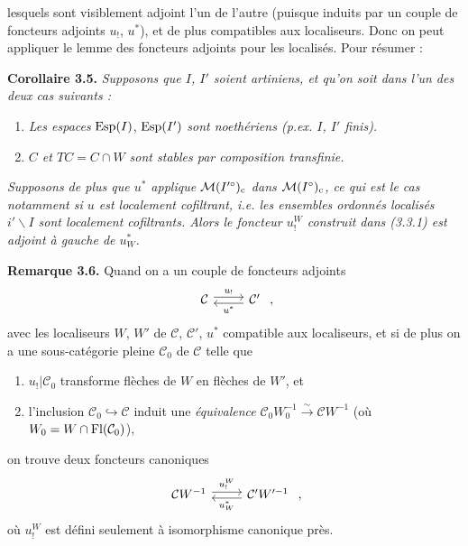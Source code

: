 lesquels sont visiblement adjoint l'un de l'autre (puisque induits par un couple de foncteurs %
adjoints $u_!$, $u^*$), et de plus compatibles aux localiseurs. Donc on peut appliquer le lemme des foncteurs adjoints pour les localisés. Pour résumer :

\textbf{Corollaire 3.5.} \textit{Supposons que $I$, $I'$ soient artiniens, et qu'on soit dans l'un des deux cas suivants :}
\begin{enumerate}
\item[a)] \textit{Les espaces} $\operatorname{Esp}(I)$, $\operatorname{Esp}(I')$ \textit{sont noethériens (p.ex. $I$, $I'$ finis).}
\item[b)] \textit{$C$ et $TC = C\cap W$ sont stables par composition transfinie.}
\end{enumerate}
\textit{Supposons de plus que $u^*$ applique $\mathcal{M}(I'^\circ)_{\mathrm{c}}$ dans $\mathcal{M}(I^\circ)_{\mathrm{c}}$, ce qui est le cas notamment si $u$ est localement cofiltrant, i.e. les ensembles ordonnés localisés $i'\backslash I$ sont localement cofiltrants. Alors le foncteur $u_!^W$ construit dans (3.3.1) est adjoint à gauche de $u_W^*$.}

\textbf{Remarque 3.6.} Quand on a un couple de foncteurs adjoints
\[
\begin{tikzcd}
\mathcal{C} \arrow[r, shift left, "u_!"] & \mathcal{C}' \arrow[l, shift left, "u^*"]
\end{tikzcd}
\ ,
\]
avec les localiseurs $W$, $W'$ de $\mathcal{C}$, $\mathcal{C}'$, $u^*$ compatible aux localiseurs, et si de plus on a une sous-catégorie pleine $\mathcal{C}_0$ de $\mathcal{C}$ telle que
\begin{enumerate}
\item[a)] $u_!|\mathcal{C}_0$ transforme flèches de $W$ en flèches de $W'$, et
\item[b)] l'inclusion $\mathcal{C}_0 \hookrightarrow \mathcal{C}$ induit une \textit{équivalence} $\mathcal{C}_0W_0^{-1} \xrightarrow{\sim} \mathcal{C}W^{-1}$ (où $W_0 = W\cap\mathrm{Fl}(\mathcal{C}_0)$),
\end{enumerate}
on trouve deux foncteurs canoniques
\[
\begin{tikzcd}
\mathcal{C}W^{-1} \arrow[r, shift left, "u_!^W"] & \mathcal{C}'W'^{-1} \arrow[l, shift left, "u_W^*"]
\end{tikzcd}
\ ,
\]
où $u_!^W$ est défini seulement à isomorphisme canonique près.


